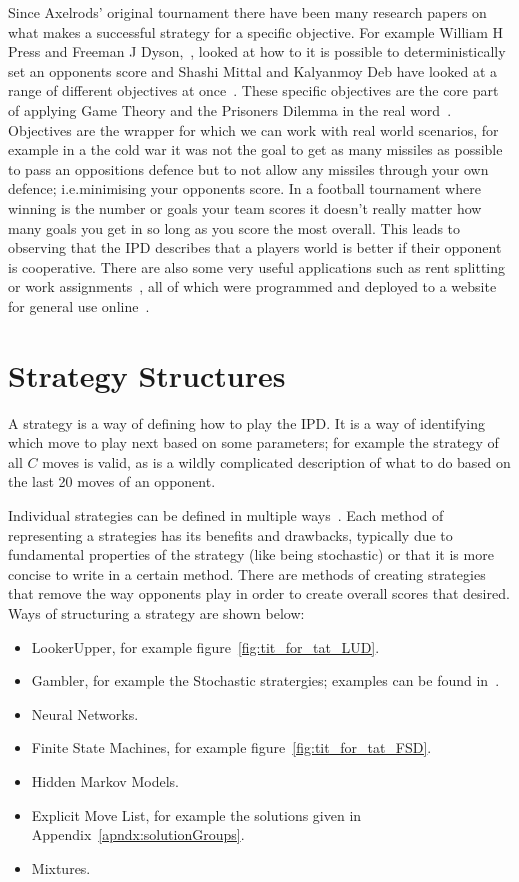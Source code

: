 Since Axelrods' original tournament there have been many research papers on what makes a successful strategy for a specific objective.
For example William H Press and Freeman J Dyson,~\cite{press2012iterated}, looked at how to it is possible to deterministically set an opponents score and Shashi Mittal and Kalyanmoy Deb have looked at a range of different objectives at once~\cite{mittal2009optimal}.
These specific objectives are the core part of applying Game Theory and the Prisoners Dilemma in the real word~\cite{rehmeyer2012climateNegotiations,osang2013environmental,Schneier2012doping}.
Objectives are the wrapper for which we can work with real world scenarios, for example in a the cold war it was not the goal to get as many missiles as possible to pass an oppositions defence but to not allow any missiles through your own defence; i.e.minimising your opponents score.
In a football tournament where winning is the number or goals your team scores it doesn't really matter how many goals you get in so long as you score the most overall.
This leads to observing that the IPD describes that a players world is better if their opponent is cooperative.  
There are also some very useful applications such as rent splitting or work assignments~\cite{goldman2015spliddit}, all of which were programmed and deployed to a website for general use online~\cite{spliddit}.

\section{Strategy Structures}\label{sec:stratergyStructures}
A strategy is a way of defining how to play the IPD. 
It is a way of identifying which move to play next based on some parameters; for example the strategy of all $C$ moves is valid, as is a wildly complicated description of what to do based on the last 20 moves of an opponent.

Individual strategies can be defined in multiple ways~\cite{harper2017reinforcement}.
Each method of representing a strategies has its benefits and drawbacks, typically due to fundamental properties of the strategy (like being stochastic) or that it is more concise to write in a certain method.
There are methods of creating strategies that remove the way opponents play in order to create overall scores that desired.
Ways of structuring a strategy are shown below:

\begin{itemize}
 \item LookerUpper, for example figure~\ref{fig:tit_for_tat_LUD}.
 \item Gambler, for example the Stochastic stratergies; examples can be found in~\cite{press2012iterated}.
 \item Neural Networks.
 \item Finite State Machines, for example figure~\ref{fig:tit_for_tat_FSD}.
 \item Hidden Markov Models.
 \item Explicit Move List, for example the solutions given in Appendix~\ref{apndx:solutionGroups}.
 \item Mixtures.
\end{itemize}

